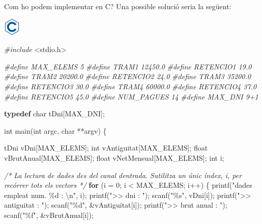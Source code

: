 \documentclass[]{book}
\newenvironment{Shaded}{\begin{snugshade}}{\end{snugshade}}
\newcommand{\CommentTok}[1]{\textcolor[rgb]{0.56,0.35,0.01}{\textit{#1}}}
\newcommand{\ControlFlowTok}[1]{\textcolor[rgb]{0.13,0.29,0.53}{\textbf{#1}}}
\newcommand{\DataTypeTok}[1]{\textcolor[rgb]{0.13,0.29,0.53}{#1}}
\newcommand{\DecValTok}[1]{\textcolor[rgb]{0.00,0.00,0.81}{#1}}
\newcommand{\ImportTok}[1]{#1}
\newcommand{\KeywordTok}[1]{\textcolor[rgb]{0.13,0.29,0.53}{\textbf{#1}}}
\newcommand{\NormalTok}[1]{#1}
\newcommand{\PreprocessorTok}[1]{\textcolor[rgb]{0.56,0.35,0.01}{\textit{#1}}}
\newcommand{\SpecialCharTok}[1]{\textcolor[rgb]{0.00,0.00,0.00}{#1}}
\newcommand{\StringTok}[1]{\textcolor[rgb]{0.31,0.60,0.02}{#1}}
\begin{document}
Com ho podem implementar en C? Una possible solució seria la següent:

\includegraphics{./img/c.png}

\begin{Shaded}
\begin{Highlighting}[]
\PreprocessorTok{\#include }\ImportTok{\textless{}stdio.h\textgreater{}}

\PreprocessorTok{\#define MAX\_ELEMS 5}
\PreprocessorTok{\#define TRAM1 12450.0}
\PreprocessorTok{\#define RETENCIO1 19.0}
\PreprocessorTok{\#define TRAM2 20200.0}
\PreprocessorTok{\#define RETENCIO2 24.0}
\PreprocessorTok{\#define TRAM3 35200.0}
\PreprocessorTok{\#define RETENCIO3 30.0}
\PreprocessorTok{\#define TRAM4 60000.0}
\PreprocessorTok{\#define RETENCIO4 37.0}
\PreprocessorTok{\#define RETENCIO5 45.0}
\PreprocessorTok{\#define NUM\_PAGUES 14}
\PreprocessorTok{\#define MAX\_DNI 9+1}

\KeywordTok{typedef} \DataTypeTok{char}\NormalTok{ tDni[MAX\_DNI];}

\DataTypeTok{int}\NormalTok{ main(}\DataTypeTok{int}\NormalTok{ argc, }\DataTypeTok{char}\NormalTok{ **argv) \{}

\NormalTok{    tDni vDni[MAX\_ELEMS];}
    \DataTypeTok{int}\NormalTok{ vAntiguitat[MAX\_ELEMS];}
    \DataTypeTok{float}\NormalTok{ vBrutAnual[MAX\_ELEMS];}
    \DataTypeTok{float}\NormalTok{ vNetMensual[MAX\_ELEMS];}
    \DataTypeTok{int}\NormalTok{ i;}

    \CommentTok{/* La lectura de dades des del canal d\textquotesingle{}entrada.}
\CommentTok{       S\textquotesingle{}utilitza un únic índex, i, per recórrer tots els vectors */}
    \ControlFlowTok{for}\NormalTok{ (i = }\DecValTok{0}\NormalTok{; i \textless{} MAX\_ELEMS; i++) \{}
\NormalTok{        printf(}\StringTok{"dades empleat num. \%d : }\SpecialCharTok{\textbackslash{}n}\StringTok{"}\NormalTok{, i);}
\NormalTok{        printf(}\StringTok{"\textgreater{}\textgreater{} dni : "}\NormalTok{);}
\NormalTok{        scanf(}\StringTok{"\%s"}\NormalTok{, vDni[i]);}
\NormalTok{        printf(}\StringTok{"\textgreater{}\textgreater{} antiguitat : "}\NormalTok{);}
\NormalTok{        scanf(}\StringTok{"\%d"}\NormalTok{, \&vAntiguitat[i]);}
\NormalTok{        printf(}\StringTok{"\textgreater{}\textgreater{} brut anual : "}\NormalTok{);}
\NormalTok{        scanf(}\StringTok{"\%f"}\NormalTok{, \&vBrutAnual[i]);}
        

\end{Highlighting}
\end{Shaded}
\end{document}

